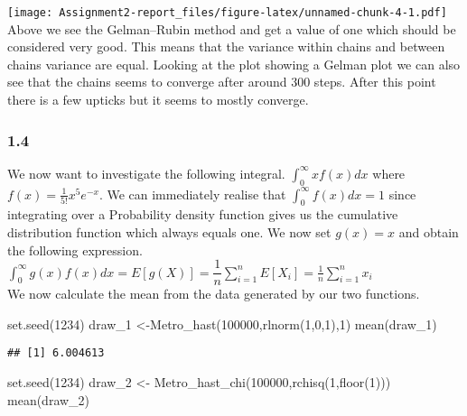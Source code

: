 \documentclass[
]{article}
\newenvironment{Shaded}{\begin{snugshade}}{\end{snugshade}}
\newcommand{\DecValTok}[1]{\textcolor[rgb]{0.00,0.00,0.81}{#1}}
\newcommand{\FunctionTok}[1]{\textcolor[rgb]{0.00,0.00,0.00}{#1}}
\newcommand{\NormalTok}[1]{#1}
\newcommand{\OtherTok}[1]{\textcolor[rgb]{0.56,0.35,0.01}{#1}}
\begin{document}
\texttt{[image: Assignment2-report\_files/figure-latex/unnamed-chunk-4-1.pdf]}
Above we see the Gelman--Rubin method and get a value of one which
should be considered very good. This means that the variance within
chains and between chains variance are equal. Looking at the plot
showing a Gelman plot we can also see that the chains seems to converge
after around 300 steps. After this point there is a few upticks but it
seems to mostly converge.

\hypertarget{section-1}{%
\subsubsection{1.4}\label{section-1}}

We now want to investigate the following integral.
\(\int_{0}^{\infty} xf(x) dx\) where \(f(x)= \frac{1}{5!}x^5e^{-x}\). We
can immediately realise that \(\int_{0}^{\infty} f(x) dx = 1\) since
integrating over a Probability density function gives us the cumulative
distribution function which always equals one. We now set \(g(x) = x\)
and obtain the following expression.
\(\int_{0}^{\infty} g(x)f(x)dx= E[g(X)]= \dfrac{1}{n}\sum_{i=1}^{n}E[X_i]=\frac{1}{n}\sum_{i=1}^{n}x_{i}\)\\
We now calculate the mean from the data generated by our two functions.

\begin{Shaded}
\begin{Highlighting}[]
\FunctionTok{set.seed}\NormalTok{(}\DecValTok{1234}\NormalTok{)}
\NormalTok{draw\_1 }\OtherTok{\textless{}{-}}\FunctionTok{Metro\_hast}\NormalTok{(}\DecValTok{100000}\NormalTok{,}\FunctionTok{rlnorm}\NormalTok{(}\DecValTok{1}\NormalTok{,}\DecValTok{0}\NormalTok{,}\DecValTok{1}\NormalTok{),}\DecValTok{1}\NormalTok{)}
\FunctionTok{mean}\NormalTok{(draw\_1)}
\end{Highlighting}
\end{Shaded}

\begin{verbatim}
## [1] 6.004613
\end{verbatim}

\begin{Shaded}
\begin{Highlighting}[]
\FunctionTok{set.seed}\NormalTok{(}\DecValTok{1234}\NormalTok{)}
\NormalTok{draw\_2 }\OtherTok{\textless{}{-}} \FunctionTok{Metro\_hast\_chi}\NormalTok{(}\DecValTok{100000}\NormalTok{,}\FunctionTok{rchisq}\NormalTok{(}\DecValTok{1}\NormalTok{,}\FunctionTok{floor}\NormalTok{(}\DecValTok{1}\NormalTok{)))}
\FunctionTok{mean}\NormalTok{(draw\_2)}
\end{Highlighting}
\end{Shaded}
\end{document}
